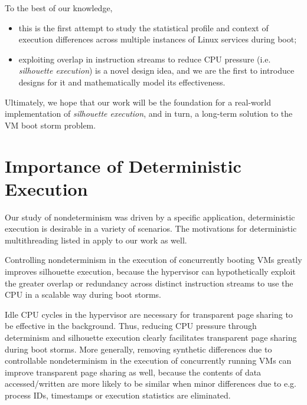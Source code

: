 \noindent To the best of our knowledge,
\begin {itemize}
\item this is the first attempt to study the statistical profile and context of execution differences
  across multiple instances of Linux services during boot;
\item exploiting overlap in instruction streams to reduce CPU pressure (i.e. {\em silhouette execution}) is a novel 
  design idea, and we are the first to introduce designs for it and mathematically model its effectiveness.
\end {itemize}

\noindent Ultimately, we hope that our work will be the foundation for a real-world implementation of {\em silhouette execution},
and in turn, a long-term solution to the VM boot storm problem. 

\section{Importance of Deterministic Execution}
Our study of nondeterminism was driven by a specific application,
deterministic execution is desirable in a variety of scenarios.
The motivations for deterministic multithreading listed in
\cite{marek2011scaling, patil2010pinplay} apply to our work as well. \newline

 \newline 
Controlling nondeterminism in the execution of concurrently
booting VMs greatly improves silhouette execution, because the hypervisor
can hypothetically exploit the greater overlap or redundancy
across distinct instruction streams to use the CPU
in a scalable way during boot storms. \newline

 \newline
Idle CPU cycles in the hypervisor are necessary for transparent page sharing
to be effective in the background. Thus, reducing CPU 
pressure through determinism and silhouette execution clearly facilitates
transparent page sharing during boot storms.
More generally, removing synthetic differences due to controllable nondeterminism in the execution
of concurrently running VMs can improve transparent page sharing
as well, because the contents of data accessed/written are more likely
to be similar when minor differences due to e.g. process IDs,
timestamps or execution statistics are eliminated. \newline

